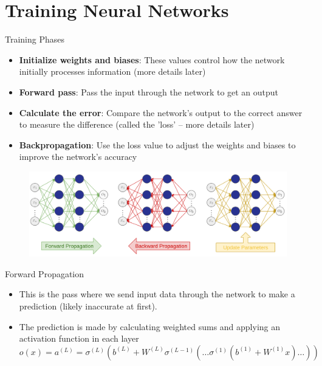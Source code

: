 \documentclass[serif, aspectratio=169]{beamer}
\begin{document}
\section{Training Neural Networks}
\begin{frame}{Training Phases}
	\begin{itemize}
		\item \textbf{Initialize weights and biases}: These values control how the network initially processes information (more details later)
		\item \textbf{Forward pass}: Pass the input through the network to get an output
		\item \textbf{Calculate the error}: Compare the network's output to the correct answer to measure the difference (called the 'loss' -- more details later) 
		\item \textbf{Backpropagation}: Use the loss value to adjust the weights and biases to improve the network's accuracy
	\end{itemize}
	\begin{figure}[bh]
		\includegraphics[keepaspectratio, scale=0.2]{pic/4/training-phases.png}
	\end{figure}
\end{frame}

\begin{frame}[t]{Forward Propagation}
	\begin{itemize}
		\item This is the pass where we send input data through the network to make a prediction (likely inaccurate at first).
		\item The prediction is made by calculating weighted sums and applying an activation function in each layer
		      $$ o(x) = a^{(L)} = \sigma^{(L)}\left( b^{(L)} + W^{(L)}  \sigma^{(L-1)}\left( \ldots \sigma^{(1)}(b^{(1)} + W^{(1)}  x)  \ldots \right) \right) $$
	\end{itemize}
\end{frame}
\end{document}
